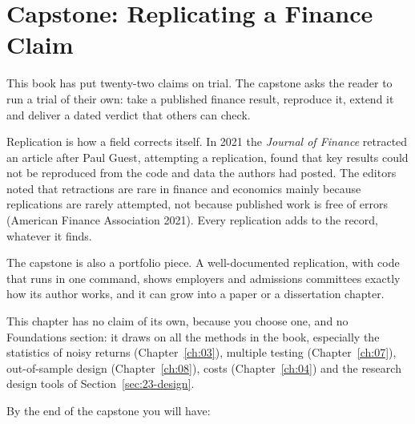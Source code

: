 \makeatletter
{}
\makeatother

\chapter{Capstone: Replicating a Finance Claim}
\label{ch:23}

This book has put twenty-two claims on trial. The capstone asks the reader to run a trial of their own: take a published finance result, reproduce it, extend it and deliver a dated verdict that others can check.

Replication is how a field corrects itself. In 2021 the \emph{Journal of Finance} retracted an article after Paul Guest, attempting a replication, found that key results could not be reproduced from the code and data the authors had posted. The editors noted that retractions are rare in finance and economics mainly because replications are rarely attempted, not because published work is free of errors (American Finance Association 2021). Every replication adds to the record, whatever it finds.

The capstone is also a portfolio piece. A well-documented replication, with code that runs in one command, shows employers and admissions committees exactly how its author works, and it can grow into a paper or a dissertation chapter.

This chapter has no claim of its own, because you choose one, and no Foundations section: it draws on all the methods in the book, especially the statistics of noisy returns (Chapter~\ref{ch:03}), multiple testing (Chapter~\ref{ch:07}), out-of-sample design (Chapter~\ref{ch:08}), costs (Chapter~\ref{ch:04}) and the research design tools of Section~\ref{sec:23-design}.

By the end of the capstone you will have:

